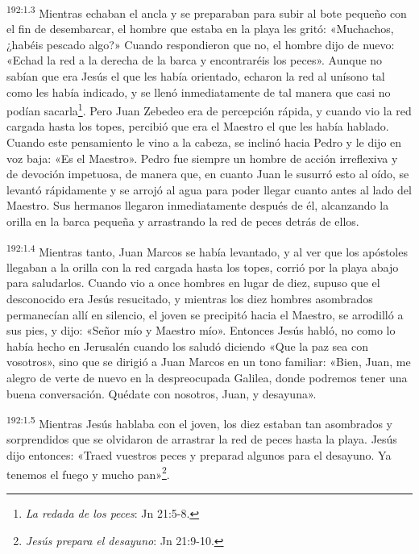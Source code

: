 \par
\textsuperscript{192:1.3} Mientras echaban el ancla y se preparaban para subir al bote pequeño con el fin de desembarcar, el hombre que estaba en la playa les gritó: «Muchachos, ¿habéis pescado algo?» Cuando respondieron que no, el hombre dijo de nuevo: «Echad la red a la derecha de la barca y encontraréis los peces». Aunque no sabían que era Jesús el que les había orientado, echaron la red al unísono tal como les había indicado, y se llenó inmediatamente de tal manera que casi no podían sacarla\footnote{\textit{La redada de los peces}: Jn 21:5-8.}. Pero Juan Zebedeo era de percepción rápida, y cuando vio la red cargada hasta los topes, percibió que era el Maestro el que les había hablado. Cuando este pensamiento le vino a la cabeza, se inclinó hacia Pedro y le dijo en voz baja: «Es el Maestro». Pedro fue siempre un hombre de acción irreflexiva y de devoción impetuosa, de manera que, en cuanto Juan le susurró esto al oído, se levantó rápidamente y se arrojó al agua para poder llegar cuanto antes al lado del Maestro. Sus hermanos llegaron inmediatamente después de él, alcanzando la orilla en la barca pequeña y arrastrando la red de peces detrás de ellos.

\par
\textsuperscript{192:1.4} Mientras tanto, Juan Marcos se había levantado, y al ver que los apóstoles llegaban a la orilla con la red cargada hasta los topes, corrió por la playa abajo para saludarlos. Cuando vio a once hombres en lugar de diez, supuso que el desconocido era Jesús resucitado, y mientras los diez hombres asombrados permanecían allí en silencio, el joven se precipitó hacia el Maestro, se arrodilló a sus pies, y dijo: «Señor mío y Maestro mío». Entonces Jesús habló, no como lo había hecho en Jerusalén cuando los saludó diciendo «Que la paz sea con vosotros», sino que se dirigió a Juan Marcos en un tono familiar: «Bien, Juan, me alegro de verte de nuevo en la despreocupada Galilea, donde podremos tener una buena conversación. Quédate con nosotros, Juan, y desayuna».

\par
\textsuperscript{192:1.5} Mientras Jesús hablaba con el joven, los diez estaban tan asombrados y sorprendidos que se olvidaron de arrastrar la red de peces hasta la playa. Jesús dijo entonces: «Traed vuestros peces y preparad algunos para el desayuno. Ya tenemos el fuego y mucho pan»\footnote{\textit{Jesús prepara el desayuno}: Jn 21:9-10.}.

